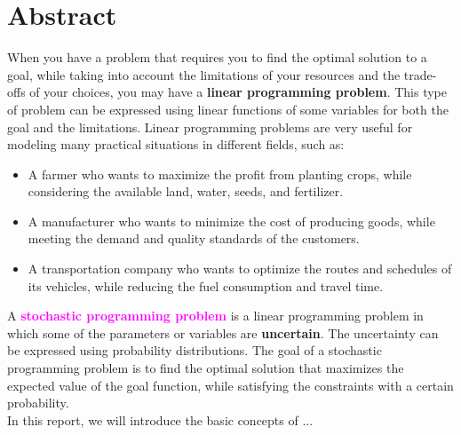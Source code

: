 \newpage
\section{Abstract}
\qquad When you have a problem that requires you to find the optimal solution to a goal, while taking into account the limitations of your resources and the trade-offs of your choices, you may have a \textbf{linear programming problem}. This type of problem can be expressed using linear functions of some variables for both the goal and the limitations. Linear programming problems are very useful for modeling many practical situations in different fields, such as:

\begin{itemize}
	\item A farmer who wants to maximize the profit from planting crops, while considering the available land, water, seeds, and fertilizer.
	\item A manufacturer who wants to minimize the cost of producing goods, while meeting the demand and quality standards of the customers.
	\item A transportation company who wants to optimize the routes and schedules of its vehicles, while reducing the fuel consumption and travel time.\\
\end{itemize}

\qquad A \textcolor{magenta}{\textbf{stochastic programming problem}} is a linear programming problem in which some of the parameters or variables are \textbf{uncertain}. The uncertainty can be expressed using probability distributions. The goal of a stochastic programming problem is to find the optimal solution that maximizes the expected value of the goal function, while satisfying the constraints with a certain probability.\\

\qquad In this report, we will introduce the basic concepts of ...
